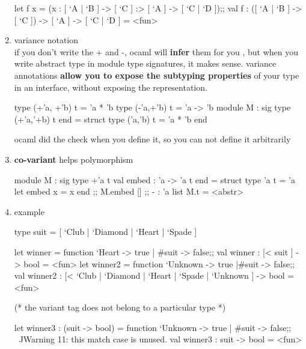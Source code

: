 \begin{enumerate}
\begin{alternate}
let f x = (x : [ `A | `B ] -> [ `C ] :> [ `A ] -> [ `C | `D ]);;
val f : ([ `A | `B ] -> [ `C ]) -> [ `A ] -> [ `C | `D ] = <fun>
\end{alternate}

  \item variance notation \\
    if you don't write the + and -, ocaml will \textbf{infer} them for you ,
    but when you write abstract type in module type signatures, it makes sense.
    variance annotations \textbf{allow you to expose the subtyping properties} of your type
    in an interface, without exposing the representation.

\begin{ocamlcode}
type (+'a, +'b) t = 'a * 'b
type (-'a,+'b) t = 'a -> 'b 
module M : sig
  type (+'a,'+b) t
end = struct
  type ('a,'b) t = 'a * 'b 
end
\end{ocamlcode}
ocaml did the check when you define it, so you can not define it arbitrarily

  \item \textbf{co-variant} helps polymorphism

\begin{alternate}
module M : sig
    type +'a t
    val embed : 'a -> 'a t
  end = struct
    type 'a t = 'a
    let embed x = x
end ;;
M.embed []  ;;
- : 'a list M.t = <abstr>
\end{alternate}


  \item example

\begin{alternate}
type suit = [ `Club | `Diamond | `Heart | `Spade ]
  
let winner = function `Heart -> true | #suit -> false;;
val winner : [< suit ] -> bool = <fun>
let winner2 = function `Unknown -> true |#suit -> false;;
val winner2 : [< `Club | `Diamond | `Heart | `Spade | `Unknown ] -> bool =
  <fun>

(* the variant tag does not belong to a particular type *)

let winner3 : (suit -> bool) = function `Unknown -> true | #suit -> false;;
                                          ^^^^^^^^
Warning 11: this match case is unused.
val winner3 : suit -> bool = <fun>

\end{alternate}

  \end{enumerate}
